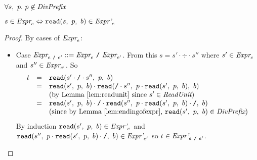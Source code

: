\documentclass[preprint,10pt]{sigplanconf}
\begin{document}
\begin{lemma}\mbox{}
  
  \( \forall s,~p. ~p \not \in \textit{DivPrefix} \)

  \( s \in \textit{Expr}_{e} \Leftrightarrow \texttt{read}(s,~p,~b) \in \textit{Expr'}_{e} \)
\end{lemma}
\begin{proof}
  
  By cases of \( \textit{Expr}_{e} \):

  \begin{itemize}

  \item Case \(\textit{Expr}_{e~\texttt{/}~e'} ::= \textit{Expr}_{e} ~\texttt{/}~ \textit{Expr}_{e'} \).
    From this \( s = s' \cdot \div \cdot s'' \) where \( s' \in
    \textit{Expr}_{e} \) and \( s'' \in \textit{Expr}_{e'} \). So
    \[
    \begin{array}{rcl}
      t &=& \texttt{read}(s' \cdot \texttt{/} \cdot s'',~p,~b)
      \\
      &=& \texttt{read}(s',~p,~b) \cdot \texttt{read}(\texttt{/} \cdot s'',~
        p\cdot \texttt{read}(s',~p,~b)
      ,~b)
      \\
      &&\textrm{(by Lemma \ref{lem:readunit} since \( s' \in \textit{ReadUnit} \))}
      \\
      &=& \texttt{read}(s',~p,~b) \cdot \texttt{/} \cdot 
      \texttt{read}(s'',~
        p\cdot \texttt{read}(s',~p,~b) \cdot \texttt{/}
      ,~b)
      \\
      &&\textrm{(since by Lemma \ref{lem:endingofexpr}, \(
        \texttt{read}(s',~p,~b) \in \textit{DivPrefix}\))}
      \\
    \end{array}
    \]
    By induction \( \texttt{read}(s',~p,~b) \in \textit{Expr'}_{e} \) and
    \( 
      \texttt{read}(s'',~
        p\cdot \texttt{read}(s',~p,~b) \cdot \texttt{/}
      ,~b) \in \textit{Expr'}_{e'}
      \) so \( t \in \textit{Expr'}_{e ~\texttt{/}~ e'} \).

  \end{itemize}
\end{proof}


\end{document}
